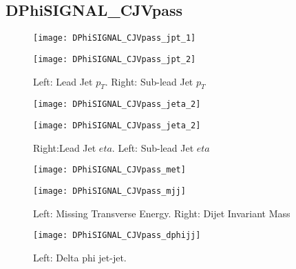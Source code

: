 \documentclass[a4paper,10pt]{article}
\begin{document}
\clearpage
\subsection{DPhiSIGNAL\_CJVpass}

\begin{figure}[!h]
\centering
\begin{minipage}[!h]{0.4\linewidth}
\centering
\texttt{[image: DPhiSIGNAL\_CJVpass\_jpt\_1]}
\end{minipage}%
\begin{minipage}[!h]{0.4\linewidth}
  \texttt{[image: DPhiSIGNAL\_CJVpass\_jpt\_2]}
\end{minipage}
\caption{Left: Lead Jet $p_T$. Right: Sub-lead Jet $p_T$}
\end{figure}

\begin{figure}[!h]
\centering
\begin{minipage}[!h]{0.4\linewidth}
\centering
\texttt{[image: DPhiSIGNAL\_CJVpass\_jeta\_2]}
\end{minipage}%
\begin{minipage}[!h]{0.4\linewidth}
\centering
\texttt{[image: DPhiSIGNAL\_CJVpass\_jeta\_2]}
\end{minipage}
\caption{Right:Lead Jet $eta$. Left: Sub-lead Jet $eta$}
\end{figure}

\begin{figure}[!h]
\centering
\begin{minipage}[!h]{0.4\linewidth}
\centering
\texttt{[image: DPhiSIGNAL\_CJVpass\_met]}
\end{minipage}%
\begin{minipage}[!h]{0.4\linewidth}
\centering
\texttt{[image: DPhiSIGNAL\_CJVpass\_mjj]}
\end{minipage}
\caption{Left: Missing Transverse Energy. Right: Dijet Invariant Mass}
\end{figure}

\begin{figure}[!h]
\centering
\begin{minipage}[!h]{0.4\linewidth}
\centering
\texttt{[image: DPhiSIGNAL\_CJVpass\_dphijj]}
\end{minipage}%
\begin{minipage}[!h]{0.4\linewidth}
\centering
\end{minipage}
\caption{Left: Delta phi jet-jet.}
\end{figure}
\end{document}
